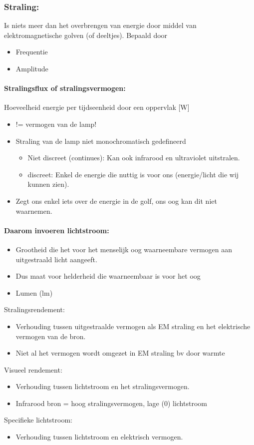 \documentclass[12pt]{article}
\begin{document}
\subsubsection{Straling:}
Is niets meer dan het overbrengen van energie door middel van elektromagnetische golven (of deeltjes). Bepaald door\begin{itemize}
    \item Frequentie
    \item Amplitude
\end{itemize}
\paragraph{Stralingsflux of stralingsvermogen:}
Hoeveelheid energie per tijdseenheid door een oppervlak [W]\begin{itemize}
    \item != vermogen van de lamp!
    \item Straling van de lamp niet monochromatisch gedefineerd\begin{itemize}
        \item Niet discreet (continues): Kan ook infrarood en ultraviolet uitstralen.
        \item discreet: Enkel de energie die nuttig is voor ons (energie/licht die wij kunnen zien).
    \end{itemize}
    \item Zegt ons enkel iets over de energie in de golf, ons oog kan dit niet waarnemen.
\end{itemize}
\paragraph{Daarom invoeren lichtstroom:}\begin{itemize}
    \item Grootheid die het voor het menselijk oog waarneembare vermogen aan uitgestraald licht aangeeft.
    \item Dus maat voor helderheid die waarneembaar is voor het oog
    \item Lumen (lm)
\end{itemize}
Stralingsrendement:\begin{itemize}
    \item Verhouding tussen uitgestraalde vermogen als EM straling en het elektrische vermogen van de bron.
    \item Niet al het vermogen wordt omgezet in EM straling bv door warmte
\end{itemize}
Visueel rendement:\begin{itemize}
    \item Verhouding tussen lichtstroom en het stralingsvermogen.
    \item Infrarood bron = hoog stralingsvermogen, lage (0) lichtstroom
\end{itemize}
Specifieke lichtstroom:\begin{itemize}
    \item Verhouding tussen lichtstroom en elektrisch vermogen.
\end{itemize}
\end{document}
